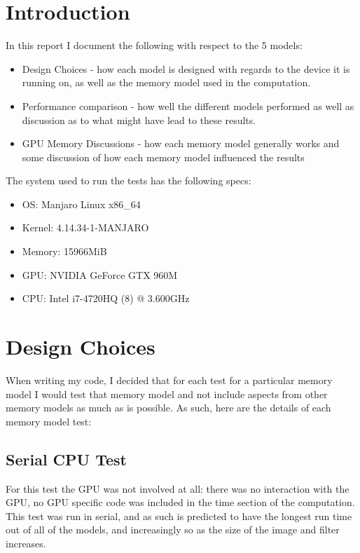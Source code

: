 \documentclass[a4paper,twoside,11pt]{report}
\begin{document}
\chapter*{Introduction}
In this report I document the following with respect to the 5 models:
\begin{itemize}
	\item Design Choices - how each model is designed with regards to the device it is running on, as well as the memory model used in the computation.
	\item Performance comparison - how well the different models performed as well as discussion as to what might have lead to these results.
	\item GPU Memory Discussions - how each memory model generally works and some discussion of how each memory model influenced the results
\end{itemize}


The system used to run the tests has the following specs:
\begin{itemize}
	\item OS: 		Manjaro Linux x86\_64 
	\item Kernel: 	4.14.34-1-MANJARO 
	\item Memory: 	15966MiB
	\item GPU:		NVIDIA GeForce GTX 960M
	\item CPU: 		Intel i7-4720HQ (8) @ 3.600GHz
\end{itemize}


\chapter*{Design Choices}
\setcounter{chapter}{2}
\setcounter{section}{0}
When writing my code, I decided that for each test for a particular memory model I would test that memory model and not include aspects from other memory models as much as is possible. As such, here are the details of each memory model test:

\section{Serial CPU Test}
For this test the GPU was not involved at all: there was no interaction with the GPU, no GPU specific code was included in the time section of the computation. This test was run in serial, and as such is predicted to have the longest run time out of all of the models, and increasingly so as the size of the image and filter increases.
\end{document}
